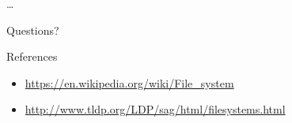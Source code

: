 \documentclass{lug}
\begin{document}
\begin{frame}{\ldots}
\end{frame}

\begin{frame}[standout]
    \Huge
    Questions?
\end{frame}

\begin{frame}{References}
    \begin{itemize}
        \item \url{https://en.wikipedia.org/wiki/File_system}
        \item \url{http://www.tldp.org/LDP/sag/html/filesystems.html}
    \end{itemize}
\end{frame}
\end{document}
